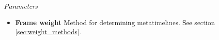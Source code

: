 \textit{Parameters}
\begin{itemize}
\item \textbf{Frame weight} Method for determining metatimelines. See section \ref{sec:weight_methods}.
\end{itemize}

\begin{comment}
\paragraph{Divergence}
\label{sec:divergence}

Quantifies differences between edge metatimelines of individual replicas. These functions are intended to be used with integer timelines to provide quality control for simulation runs. The statistical error of of many simulation setups depends on the convergence of analysed properties (see e.g. ref. \cite{Grossfield2009} for a more detailed discussion). Convergence in the context of interaction networks implies that the timelines of individual replicas should have similar probability distributions and kinetics. Edge with high divergence scores indicate that these properties differ between replicas, and therefore the simulation is not yet converged in the region surrounding these edges. Note that this method cannot prove that a simulation has converged, only pick up signs of when it is not. 

Each timeline is split into its corresponding replica blocks and the divergence is calculated as

\begin{equation}
  \label{eq:divergence}
  D(T) = \frac{1}{N} \sum_{i \neq j} d(X_i,X_j)
\end{equation}

where $N$ is the count of replica blocks, $d$ is the selected divergence method (see below) and $X_i$ is the discrete probability distribution of values contained in block $i$ of metatimeline $T$.


\end{comment}
